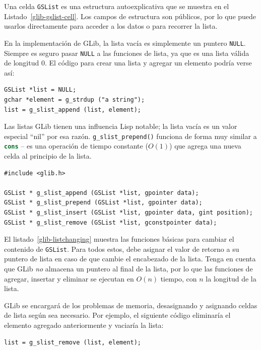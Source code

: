 Una celda \lstinline{GSList} es una estructura autoexplicativa que se muestra en el Listado~\ref{glib-gslist-cell}. Los campos de estructura son públicos, por lo que puede usarlos directamente para acceder a los datos o para recorrer la lista.

En la implementación de GLib, la lista vacía es simplemente un puntero \lstinline{NULL}. Siempre es seguro pasar \lstinline{NULL} a las funciones de lista, ya que es una lista válida de longitud 0. El código para crear una lista y agregar un elemento podría verse así:
\begin{lstlisting}
GSList *list = NULL;
gchar *element = g_strdup ("a string");
list = g_slist_append (list, element);
\end{lstlisting}

Las listas GLib tienen una influencia Lisp notable; la lista vacía es un valor especial ``nil'' por esa razón. \lstinline{g_slist_prepend()} funciona de forma muy similar a \lstinline[language=Lisp]{cons} -- es una operación de tiempo constante ($O(1)$) que agrega una nueva celda al principio de la lista.

\begin{lstlisting}[style=GLib/GTK, caption={Cambiar el contenido de la lista vinculada}, label=glib-listchanging]
#include <glib.h>

GSList * g_slist_append (GSList *list, gpointer data);
GSList * g_slist_prepend (GSList *list, gpointer data);
GSList * g_slist_insert (GSList *list, gpointer data, gint position);
GSList * g_slist_remove (GSList *list, gconstpointer data);
\end{lstlisting}

El listado~\ref{glib-listchanging} muestra las funciones básicas para cambiar el contenido de \lstinline{GSList}. Para todos estos, debe asignar el valor de retorno a su puntero de lista en caso de que cambie el encabezado de la lista. Tenga en cuenta que GLib \emph{no} almacena un puntero al final de la lista, por lo que las funciones de agregar, insertar y eliminar se ejecutan en $O(n)$ tiempo, con $n$ la longitud de la lista.

GLib se encargará de los problemas de memoria, desasignando y asignando celdas de lista según sea necesario. Por ejemplo, el siguiente código eliminaría el elemento agregado anteriormente y vaciaría la lista:

\begin{lstlisting}[style=GLib/GTK]
list = g_slist_remove (list, element);
\end{lstlisting}

